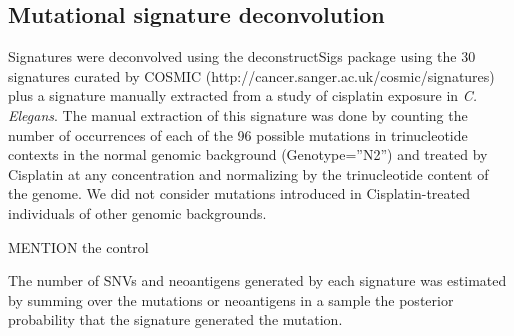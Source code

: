 \subsection*{Mutational signature deconvolution}
Signatures were deconvolved using the deconstructSigs\cite{Rosenthal_2016} package using the 30 signatures curated by COSMIC (http://cancer.sanger.ac.uk/cosmic/signatures) plus a signature manually extracted from a study of cisplatin exposure in \textit{C. Elegans}\cite{Meier_2014}. The manual extraction of this signature was done by counting the number of occurrences of each of the 96 possible mutations in trinucleotide contexts in the normal genomic background (Genotype=”N2”) and treated by Cisplatin at any concentration and normalizing by the trinucleotide content of the  genome. We did not consider mutations introduced in Cisplatin-treated individuals of other genomic backgrounds.

MENTION the control

 The number of SNVs and neoantigens generated by each signature was estimated by summing over the mutations or neoantigens in a sample the posterior probability that the signature generated the mutation.

